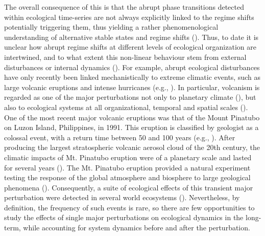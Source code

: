 \documentclass[12pt]{article}
\begin{document}
The overall consequence of this is that the abrupt phase transitions detected within ecological time-series are not always explicitly linked to the regime shifts potentially triggering them, thus yielding a rather phenomenological understanding of alternative stable states and regime shifts (\cite{Hastings2004,Montoya2017,Hastings2018,Hillebrand2020a}). Thus, to date it is unclear how abrupt regime shifts at different levels of ecological organization are intertwined, and to what extent this non-linear behaviour stem from external disturbances or internal dynamics (\cite{Scheffer2009a}). For example, abrupt ecological disturbances have only recently been linked mechanistically to extreme climatic events, such as large volcanic eruptions and intense hurricanes (e.g., \cite{Kuhnt2005,Schoener2006,Vazquez-Loureiro2019,Osland2020}). In particular, volcanism is regarded as one of the major perturbations not only to planetary climate (\cite{Osipov2021,Millan2022}), but also to ecological systems at all organizational, temporal and spatial scales (\cite{Sadler1999,Oppenheimer2003,Crisafulli2015,Jiang2022,Green2022,Chen2022a,Cabon2022}). One of the most recent major volcanic eruptions was that of the Mount Pinatubo on Luzon Island, Philippines, in 1991. This eruption is classified by geologist as a colossal event, with a return time between 50 and 100 years (e.g., \cite{Labitzke1992,Robock2000}). After producing the largest stratospheric volcanic aerosol cloud of the 20th century, the climatic impacts of Mt. Pinatubo eruption were of a planetary scale and lasted for several years (\cite{McCormick1995,Robock2002,Douglass2005}). The Mt. Pinatubo eruption provided a natural experiment testing the response of the global atmosphere and biosphere to large geological phenomena (\cite{Soden2002,Church2005,Khodri2017,Booth2012}). Consequently, a suite of ecological effects of this transient major perturbation were detected in several world ecosystems (\cite{Genin1995,Lucht2002a,Gu2003,Kuhnt2005,Trenberth2007}). Nevertheless, by definition, the frequency of such events is rare, so there are few opportunities to study the effects of single major perturbations on ecological dynamics in the long-term, while accounting for system dynamics before and after the perturbation.\\
\end{document}
